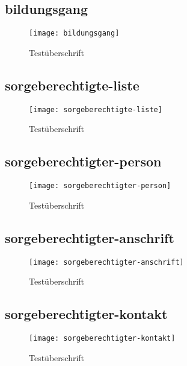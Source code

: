 \begin{landscape}
\subsection{bildungsgang}
\begin{figure}[H]
    \centering
    \caption{Testüberschrift}
    \begin{adjustbox}{width=\linewidth, center}
        \texttt{[image: bildungsgang]}
    \end{adjustbox}
\end{figure}

\subsection{sorgeberechtigte-liste}
\begin{figure}[H]
    \centering
    \caption{Testüberschrift}
    \begin{adjustbox}{width=\linewidth, center}
        \texttt{[image: sorgeberechtigte-liste]}
    \end{adjustbox}
\end{figure}

\subsection{sorgeberechtigter-person}
\begin{figure}[H]
    \centering
    \caption{Testüberschrift}
    \begin{adjustbox}{width=0.5\linewidth, center}
        \texttt{[image: sorgeberechtigter-person]}
    \end{adjustbox}
\end{figure}

\subsection{sorgeberechtigter-anschrift}
\begin{figure}[H]
    \centering
    \caption{Testüberschrift}
    \begin{adjustbox}{width=0.85\linewidth, center}
        \texttt{[image: sorgeberechtigter-anschrift]}
    \end{adjustbox}
\end{figure}

\subsection{sorgeberechtigter-kontakt}
\begin{figure}[H]
    \centering
    \caption{Testüberschrift}
    \begin{adjustbox}{width=0.6\linewidth, center}
        \texttt{[image: sorgeberechtigter-kontakt]}
    \end{adjustbox}
\end{figure}


\end{landscape}
